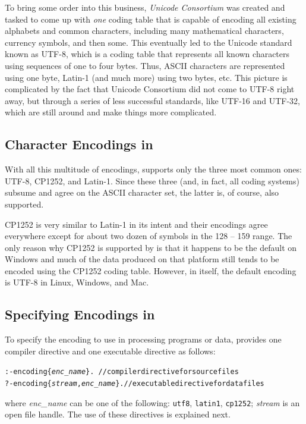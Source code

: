 \documentclass[11pt]{article}
\newcommand{\ERGO}{\mbox{\smaller{\ensuremath{\cal{E}}\smaller{{\sc{RGO}}}}}\xspace}
\newcommand{\FLSYSTEM}{\ERGO}
\begin{document}
To bring some order into this business, \emph{Unicode Consortium}   
was created and tasked to come up with \emph{one} coding table that is
capable of encoding all existing alphabets and common characters, including
many mathematical characters, currency symbols, and then some.  This eventually
led to the
Unicode standard known as UTF-8, which is a coding table that represents
all known characters using sequences of one to four bytes. Thus, ASCII
characters are represented using one byte, Latin-1 (and much more) using two
bytes, etc.
This picture is complicated by the fact that Unicode Consortium did not
come to UTF-8 right away, but through a series of less successful
standards, like UTF-16 and UTF-32, which are still around and make things
more complicated.

\subsection{Character Encodings in \FLSYSTEM}

With all this multitude of encodings,
\FLSYSTEM supports only the three most common ones:
UTF-8, CP1252, and Latin-1. Since these three (and, in fact, all coding
systems) subsume and
agree on the ASCII character set, the latter is, of course, also supported.

CP1252 is very similar to Latin-1 in its intent and their encodings agree 
everywhere except for about two dozen of symbols in the 128 -- 159 range.
The only reason why CP1252 is supported by \FLSYSTEM is that it happens to
be the default on Windows and much of the data produced on that platform
still tends to be encoded using the CP1252 coding table.
However, in \FLSYSTEM itself, the default encoding is UTF-8 in Linux,
Windows, and Mac.

\subsection{Specifying Encodings in \FLSYSTEM}

To specify the encoding to use in processing programs or data, \FLSYSTEM
provides one compiler directive and one executable directive as follows:
\begin{alltt}
:- encoding\{\textnormal{\emph{enc\_name}}\}.      \,  // compiler directive for \FLSYSTEM source files
?- encoding\{\textnormal{\emph{stream},\emph{enc\_name}}\}.  // executable directive for data files
\end{alltt}
where \emph{enc\_name} can be one of the following:  \texttt{utf8},
\texttt{latin1}, \texttt{cp1252}; \emph{stream} is an open file handle. 
The use of these directives is explained next.
\end{document}
